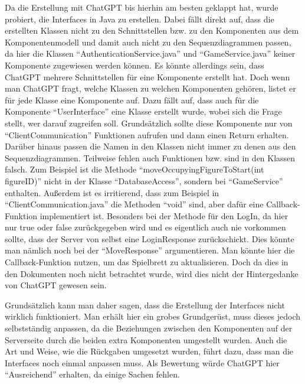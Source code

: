 Da die Erstellung mit ChatGPT bis hierhin am besten geklappt hat, wurde probiert, die Interfaces in Java zu erstellen. Dabei fällt 
direkt auf, dass die erstellten Klassen nicht zu den Schnittstellen bzw. zu den Komponenten aus dem Komponentenmodell und damit auch 
nicht zu den Sequenzdiagrammen passen, da hier die Klassen ``AuthenticationService.java'' und ``GameService.java'' keiner Komponente 
zugewiesen werden können. Es könnte allerdings sein, dass ChatGPT mehrere Schnittstellen für eine Komponente erstellt hat. Doch wenn 
man ChatGPT fragt, welche Klassen zu welchen Komponenten gehören, listet er für jede Klasse eine Komponente auf. Dazu fällt auf, dass 
auch für die Komponente ``UserInterface'' eine Klasse erstellt wurde, wobei sich die Frage stellt, wer darauf zugreifen soll. 
Grundsätzlich sollte diese Komponente nur von ``ClientCommunication'' Funktionen aufrufen und dann einen Return erhalten. Darüber hinaus 
passen die Namen in den Klassen nicht immer zu denen aus den Sequenzdiagrammen. Teilweise fehlen auch Funktionen bzw. sind in den 
Klassen falsch. Zum Beispiel ist die Methode ``moveOccupyingFigureToStart(int figureID)'' nicht in der Klasse ``DatabaseAccess'', sondern 
bei ``GameService'' enthalten. Außerdem ist es irritierend, dass zum Beispiel in ``ClientCommunication.java'' die Methoden ``void'' sind, 
aber dafür eine Callback-Funktion implementiert ist. Besonders bei der Methode für den LogIn, da hier nur true oder false 
zurückgegeben wird und es eigentlich auch nie vorkommen sollte, dass der Server von selbst eine LoginResponse zurückschickt. Dies 
könnte man nämlich noch bei der ``MoveResponse'' argumentieren. Man könnte hier die Callback-Funktion nutzen, um das Spielbrett 
zu aktualisieren. Doch da dies in den Dokumenten noch nicht betrachtet wurde, wird dies nicht der Hintergedanke von 
ChatGPT gewesen sein.

Grundsätzlich kann man daher sagen, dass die Erstellung der Interfaces nicht wirklich funktioniert. Man erhält hier ein grobes 
Grundgerüst, muss dieses jedoch selbstständig anpassen, da die Beziehungen zwischen den Komponenten auf der Serverseite durch die 
beiden extra Komponenten umgestellt wurden. Auch die Art und Weise, wie die Rückgaben umgesetzt wurden, führt dazu, dass man die 
Interfaces noch einmal anpassen muss. Als Bewertung würde ChatGPT hier ``Ausreichend'' erhalten, da einige Sachen fehlen.
